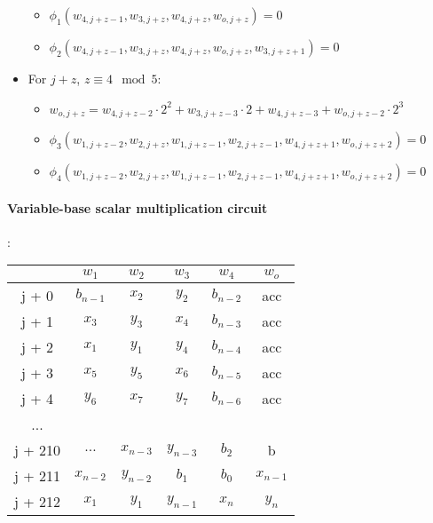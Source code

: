\begin{itemize}
	\begin{itemize}
		\item $\phi_1(w_{4, j + z - 1}, w_{3, j + z}, w_{4, j + z}, w_{o, j + z}) = 0$
		\item $\phi_2(w_{4, j + z - 1}, w_{3, j + z}, w_{4, j + z}, w_{o, j + z}, w_{3, j + z + 1}) = 0$
	\end{itemize}
	\item For $j + z$, $z \equiv 4 \mod 5$:
	\begin{itemize}
		\item $w_{o, j + z} = w_{4,j + z - 2} \cdot 2^2 + w_{3,j + z - 3} \cdot 2 + w_{4, j + z - 3} + w_{o, j + z - 2} \cdot 2^3$
		\item $\phi_3(w_{1, j + z - 2}, w_{2, j + z}, w_{1, j + z - 1}, w_{2, j + z - 1}, w_{4, j + z + 1}, w_{o, j + z + 2}) = 0$
		\item $\phi_4(w_{1, j + z - 2}, w_{2, j + z}, w_{1, j + z - 1}, w_{2, j + z - 1}, w_{4, j + z + 1}, w_{o, j + z + 2}) = 0$
	\end{itemize}
\end{itemize}

\paragraph{Variable-base scalar multiplication circuit}:
\begin{center}
\begin{tabular}{ c|c|c|c|c|c } 
  & $w_1$ & $w_2$ & $w_3$ & $w_4$ & $w_o$\\ 
 \hline
j + 0 & $b_{n - 1}$ & $x_2$ & $y_2$ & $b_{n - 2}$ & acc\\ 
j + 1 & $x_3$ & $ y_3$ & $x_4$ & $b_{n - 3}$ & acc\\ 
j + 2 & $x_1$ & $ y_1$ & $y_4$ & $b_{n - 4}$ & acc\\ 
j + 3 & $x_5$ & $y_5$ & $x_6$ & $b_{n - 5}$ & acc \\ 
j + 4 & $y_6$ & $ x_7$ & $y_7$ & $b_{n - 6}$ & acc\\
... & & & & &\\ 
j + 210 & $\dots$  & $x_{n-3}$ & $y_{n-3}$ & $b_2$ & b\\ 
j + 211 & $x_{n-2}$ & $ y_{n-2}$ & $b_1$ & $b_0$ & $x_{n-1}$\\ 
j + 212 & $x_1$ & $ y_1$ & $y_{n-1}$ & $x_n$ & $y_n$ \\ 
\end{tabular}
\end{center}

